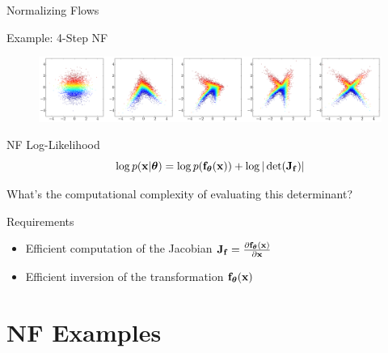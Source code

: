 \documentclass{beamer}
\begin{document}
\begin{frame}{Normalizing Flows}
	\begin{block}{Example: 4-Step NF}
		\vspace{-0.2cm}
		\begin{figure}
			\includegraphics[width=\linewidth]{figs/flow_4_steps_example.png}
		\end{figure}
	\end{block}
	\vspace{-0.5cm}
	\begin{block}{NF Log-Likelihood}
		\vspace{-0.3cm}
		\[
		\log p(\mathbf{x}|\boldsymbol{\theta}) = \log p(\mathbf{f}_{\boldsymbol{\theta}}(\mathbf{x})) + \log |\det ( \mathbf{J}_{\mathbf{f}})|
		\]
		\vspace{-0.3cm}
	\end{block}
	What's the computational complexity of evaluating this determinant?
	\begin{block}{Requirements}
		\begin{itemize}
			\item Efficient computation of the Jacobian $\mathbf{J}_{\mathbf{f}} = \frac{\partial \mathbf{f}_{\boldsymbol{\theta}}(\mathbf{x})}{\partial \mathbf{x}}$
			\item Efficient inversion of the transformation $\mathbf{f}_{\boldsymbol{\theta}}(\mathbf{x})$
		\end{itemize}
	\end{block}
\end{frame}
\section{NF Examples}
\end{document}
